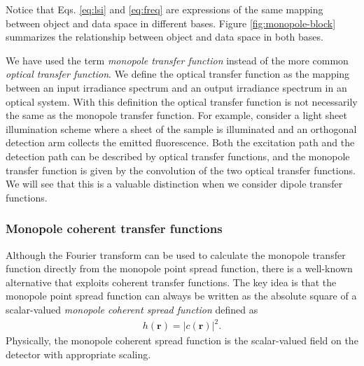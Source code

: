 \documentclass[]{osa-article}
\providecommand{\mb}[1]{\mathbf{#1}}
\begin{document}
Notice that Eqs. \ref{eq:lsi} and \ref{eq:freq} are expressions of the same
mapping between object and data space in different bases. Figure
\ref{fig:monopole-block} summarizes the relationship between object and data
space in both bases.

We have used the term \textit{monopole transfer function} instead of the more
common \textit{optical transfer function}. We define the optical transfer
function as the mapping between an input irradiance spectrum and an output
irradiance spectrum in an optical system. With this definition the optical
transfer function is not necessarily the same as the monopole transfer function.
For example, consider a light sheet illumination scheme where a sheet of the
sample is illuminated and an orthogonal detection arm collects the emitted
fluorescence. Both the excitation path and the detection path can be described
by optical transfer functions, and the monopole transfer function is given by
the convolution of the two optical transfer functions. We will see that this is
a valuable distinction when we consider dipole transfer functions.

\subsubsection{Monopole coherent transfer functions}
Although the Fourier transform can be used to calculate the monopole transfer
function directly from the monopole point spread function, there is a well-known
alternative that exploits coherent transfer functions. The key idea is that the
monopole point spread function can always be written as the absolute square of a
scalar-valued \textit{monopole coherent spread function} defined as
\begin{align}
  h(\mb{r}) = |c(\mb{r})|^2. \label{eq:absquarescalar}
\end{align}
Physically, the monopole coherent spread function is the scalar-valued field on
the detector with appropriate scaling.
\end{document}
